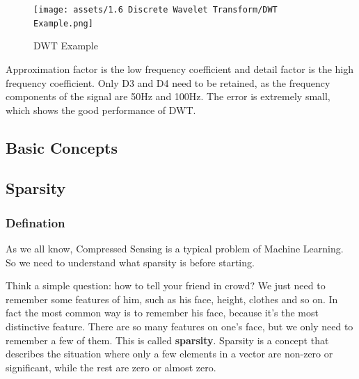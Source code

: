 \documentclass[12pt]{ctexart}
\begin{document}
\begin{figure}[H]
  \centering
  \texttt{[image: assets/1.6 Discrete Wavelet Transform/DWT
  Example.png]}
  \caption{DWT Example}
\end{figure}

Approximation factor is the low frequency coefficient and detail factor is the high frequency
coefficient. Only D3 and D4 need to be retained, as the frequency components of the signal
are 50Hz and 100Hz. The error is extremely small, which shows the good performance of DWT.

\newpage
\thispagestyle{empty}
\begin{center}
    \vspace*{96pt}
    \fontsize{60}{60}\par
    \fontsize{26}{31.2}\section{\textbf{Basic Concepts}}\par %
    \vspace{25pt}
    \fontsize{18}{21.6}\par %
    \vfill
\end{center}

\newpage
\subsection{\textbf{Sparsity}}

\subsubsection{\textbf{Defination}}

As we all know, Compressed Sensing is a typical problem of Machine Learning. So we need
to understand what sparsity is before starting.

Think a simple question: how to tell your friend in crowd? We just need to remember some
features of him, such as his face, height, clothes and so on. In fact the most common way
is to remember his face, because it's the most distinctive feature. There are so many
features on one's face, but we only need to remember a few of them. This is called
\textbf{sparsity}. Sparsity is a concept that describes the situation where only a few
elements in a vector are non-zero or significant, while the rest are zero or almost zero.
\end{document}
